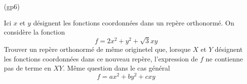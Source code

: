 \begin{tiny}(gp6)\end{tiny}
Ici $x$ et $y$ d{\'e}signent les fonctions coordonn{\'e}es dans un rep{\`e}re orthonorm{\'e}. On consid{\`e}re la fonction
\[f=2x^2+y^2+\sqrt{3}xy\]
Trouver un rep{\`e}re orthonorm{\'e} de même originetel que, lorsque $X$ et $Y$ d{\'e}signent les fonctions coordonn{\'e}es dans ce nouveau rep{\`e}re, l'expression de $f$ ne contienne pas de terme en $XY$.
M{\^e}me question dans le cas g{\'e}n{\'e}ral
\[f=ax^2+by^2+cxy\]